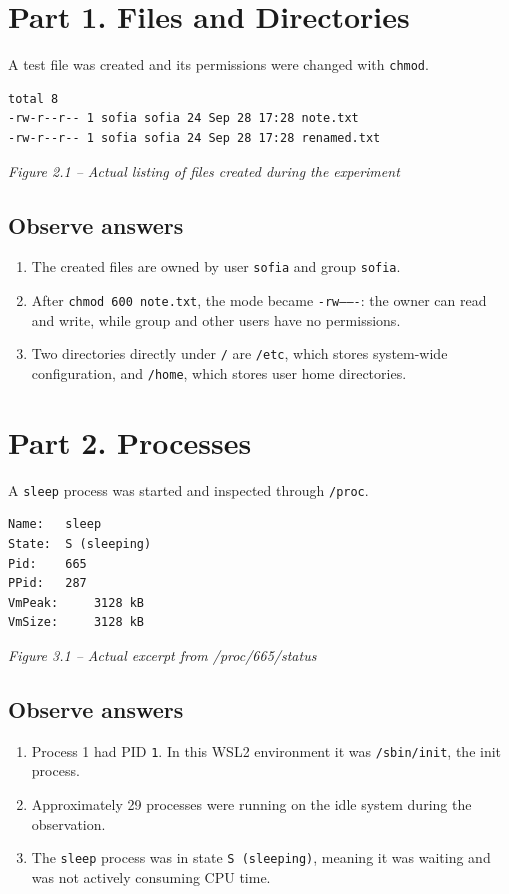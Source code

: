 \documentclass[12pt,a4paper]{article}
\newcommand{\figcap}[1]{\begin{center}\small\textit{#1}\end{center}\vspace{0.4em}}
\begin{document}
\section{Part 1. Files and Directories}
A test file was created and its permissions were changed with \texttt{chmod}.
\begin{lstlisting}
total 8
-rw-r--r-- 1 sofia sofia 24 Sep 28 17:28 note.txt
-rw-r--r-- 1 sofia sofia 24 Sep 28 17:28 renamed.txt
\end{lstlisting}
\figcap{Figure 2.1 -- Actual listing of files created during the experiment}

\subsection{Observe answers}
\begin{enumerate}[label=\arabic*.]
\item The created files are owned by user \texttt{sofia} and group \texttt{sofia}.
\item After \texttt{chmod 600 note.txt}, the mode became \texttt{-rw-------}: the owner can read and write, while group and other users have no permissions.
\item Two directories directly under \texttt{/} are \texttt{/etc}, which stores system-wide configuration, and \texttt{/home}, which stores user home directories.
\end{enumerate}

\section{Part 2. Processes}
A \texttt{sleep} process was started and inspected through \texttt{/proc}.
\begin{lstlisting}
Name:   sleep
State:  S (sleeping)
Pid:    665
PPid:   287
VmPeak:     3128 kB
VmSize:     3128 kB
\end{lstlisting}
\figcap{Figure 3.1 -- Actual excerpt from /proc/665/status}

\subsection{Observe answers}
\begin{enumerate}[label=\arabic*.]
\item Process 1 had PID \texttt{1}. In this WSL2 environment it was \texttt{/sbin/init}, the init process.
\item Approximately 29 processes were running on the idle system during the observation.
\item The \texttt{sleep} process was in state \texttt{S (sleeping)}, meaning it was waiting and was not actively consuming CPU time.
\end{enumerate}
\end{document}
